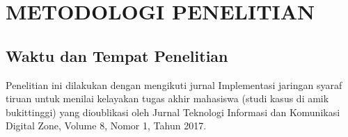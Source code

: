 
\chapter{METODOLOGI PENELITIAN}                

\section{Waktu dan Tempat Penelitian}
  Penelitian ini dilakukan dengan mengikuti jurnal Implementasi jaringan syaraf tiruan untuk menilai kelayakan tugas akhir mahasiswa (studi kasus di amik bukittinggi)
yang dioublikasi oleh Jurnal Teknologi Informasi dan Komunikasi Digital Zone, Volume 8, Nomor 1, Tahun 2017.

